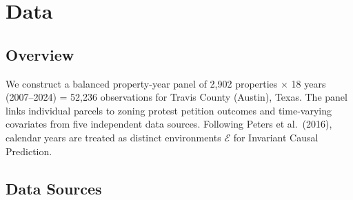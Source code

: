 %

\section{Data}
\label{sec:data}

\subsection{Overview}

We construct a balanced property-year panel of 2,902 properties $\times$ 18 years
(2007--2024) = 52,236 observations for Travis County (Austin), Texas.
The panel links individual parcels to zoning protest petition outcomes and
time-varying covariates from five independent data sources.
Following Peters et al.\ (2016), calendar years are treated as distinct environments
$\mathcal{E}$ for Invariant Causal Prediction.

\subsection{Data Sources}


